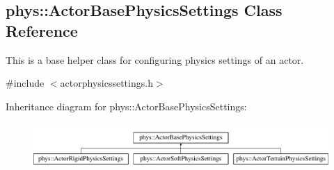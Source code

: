 \hypertarget{classphys_1_1ActorBasePhysicsSettings}{
\subsection{phys::ActorBasePhysicsSettings Class Reference}
\label{classphys_1_1ActorBasePhysicsSettings}
}


This is a base helper class for configuring physics settings of an actor.  




{\ttfamily \#include $<$actorphysicssettings.h$>$}

Inheritance diagram for phys::ActorBasePhysicsSettings:\begin{figure}[H]
\begin{center}
\leavevmode
\includegraphics[height=1.752739cm]{classphys_1_1ActorBasePhysicsSettings}
\end{center}
\end{figure}
